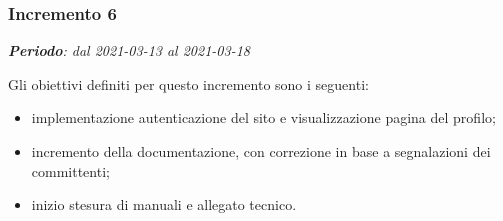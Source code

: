 \subsubsection{Incremento 6}
\textit{\textbf{Periodo}: dal 2021-03-13 al 2021-03-18}

Gli obiettivi definiti per questo incremento sono i seguenti:
\begin{itemize}
\item implementazione autenticazione del sito e visualizzazione pagina del profilo;
\item incremento della documentazione, con correzione in base a segnalazioni dei committenti;
\item inizio stesura di manuali e allegato tecnico.
\end{itemize}


